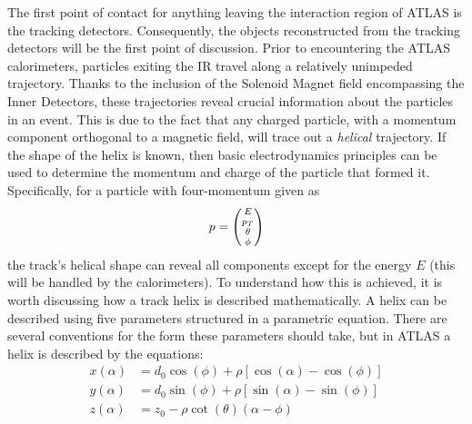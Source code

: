             The first point of contact for anything leaving the interaction region of ATLAS is the tracking detectors.
            Consequently, the objects reconstructed from the tracking detectors will be the first point of discussion.
            Prior to encountering the ATLAS calorimeters, particles exiting the IR travel along a relatively unimpeded trajectory.
            Thanks to the inclusion of the Solenoid Magnet field encompassing the Inner Detectors,
                these trajectories reveal crucial information about the particles in an event.
            This is due to the fact that any charged particle, with a momentum component orthogonal to a magnetic field,
                will trace out a \textit{helical} trajectory.
            If the shape of the helix is known, then basic electrodynamics principles can be used to determine the
                momentum and charge of the particle that formed it.
            Specifically, for a particle with four-momentum given as 
            \begin{equation}
            p = \minimatrix{E \\ p_T \\ \theta \\ \phi}
            \end{equation}
            the track's helical shape can reveal all components except for the energy $E$ (this will be handled by the calorimeters).
            To understand how this is achieved, it is worth discussing how a track helix is described mathematically.
            A helix can be described using five parameters structured in a parametric equation.
            There are several conventions for the form these parameters should take,
                but in ATLAS a helix is described by the equations\cite{thesis_giacinto}:
            \begin{equation} \begin{split}
            x(\alpha) &= d_0 \cos(\phi) + \rho \left[ \cos(\alpha) - \cos(\phi) \right] \\
            y(\alpha) &= d_0 \sin(\phi) + \rho \left[ \sin(\alpha) - \sin(\phi) \right] \\
            z(\alpha) &= z_0 - \rho \cot(\theta) (\alpha - \phi)
            \end{split} \end{equation}

